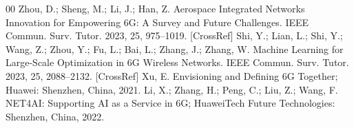 \documentclass[conference]{IEEEtran}
\begin{document}
\begin{thebibliography}{00}
 Zhou, D.; Sheng, M.; Li, J.; Han, Z. Aerospace Integrated Networks Innovation for Empowering 6G: A Survey and Future Challenges. IEEE Commun. Surv. Tutor. 2023, 25, 975–1019. [CrossRef]
 Shi, Y.; Lian, L.; Shi, Y.; Wang, Z.; Zhou, Y.; Fu, L.; Bai, L.; Zhang, J.; Zhang, W. Machine Learning for Large-Scale Optimization in 6G Wireless Networks. IEEE Commun. Surv. Tutor. 2023, 25, 2088–2132. [CrossRef]
 Xu, E. Envisioning and Defining 6G Together; Huawei: Shenzhen, China, 2021.
 Li, X.; Zhang, H.; Peng, C.; Liu, Z.; Wang, F. NET4AI: Supporting AI as a Service in 6G; HuaweiTech Future Technologies: Shenzhen, China, 2022.
\end{thebibliography}
\end{document}
